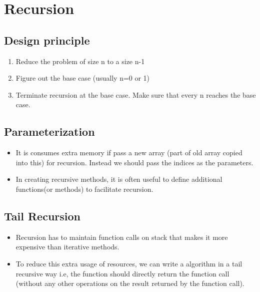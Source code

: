 \documentclass{article}
\title{}
\author{Vishal Neeli}
\begin{document}
\maketitle

\section{Recursion}

	\subsection{Design principle}
	\begin{enumerate}
		\item Reduce the problem of size n to a size n-1
		\item Figure out the base case (usually n=0 or 1)
		\item Terminate recursion at the base case. Make sure that every n reaches the base case.

	\end{enumerate}

	\subsection{Parameterization}
	\begin{itemize}
		\item It is consumes extra memory if pass a new array (part of old array copied into this) for recursion. Instead we should pass the indices as the parameters.
		\item In creating recursive methods, it is often useful to define additional functions(or methods) to facilitate recursion.

	\end{itemize}

	\subsection{Tail Recursion}
	\begin{itemize}
		\item Recursion has to maintain function calls on stack that makes it more expensive than iterative methods.
		\item To reduce this extra usage of resources, we can write a algorithm in a tail recursive way i.e, the function should directly return the function call (without any other operations on the result returned by the function call).
	\end{itemize}
\end{document}
